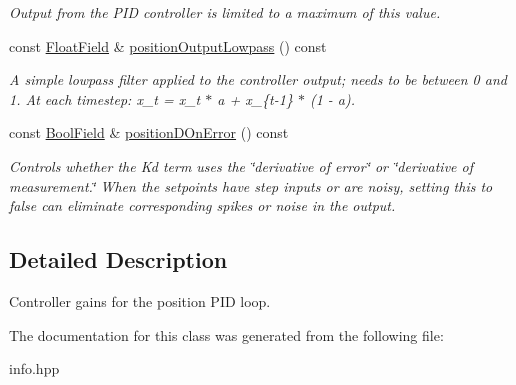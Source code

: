\begin{DoxyCompactItemize}
\begin{DoxyCompactList}\small\item\em Output from the P\+ID controller is limited to a maximum of this value. \end{DoxyCompactList}\item 
const \hyperlink{classhebi_1_1Info_1_1FloatField}{Float\+Field} \& \hyperlink{classhebi_1_1Info_1_1Settings_1_1Actuator_1_1PositionGains_ac477a60c54f5364cf1c687c014bcff89}{position\+Output\+Lowpass} () const \hypertarget{classhebi_1_1Info_1_1Settings_1_1Actuator_1_1PositionGains_ac477a60c54f5364cf1c687c014bcff89}{}\label{classhebi_1_1Info_1_1Settings_1_1Actuator_1_1PositionGains_ac477a60c54f5364cf1c687c014bcff89}

\begin{DoxyCompactList}\small\item\em A simple lowpass filter applied to the controller output; needs to be between 0 and 1. At each timestep\+: x\+\_\+t = x\+\_\+t $\ast$ a + x\+\_\+\{t-\/1\} $\ast$ (1 -\/ a). \end{DoxyCompactList}\item 
const \hyperlink{classhebi_1_1Info_1_1BoolField}{Bool\+Field} \& \hyperlink{classhebi_1_1Info_1_1Settings_1_1Actuator_1_1PositionGains_aa36f916aae582020d16b58711ec0bff6}{position\+D\+On\+Error} () const \hypertarget{classhebi_1_1Info_1_1Settings_1_1Actuator_1_1PositionGains_aa36f916aae582020d16b58711ec0bff6}{}\label{classhebi_1_1Info_1_1Settings_1_1Actuator_1_1PositionGains_aa36f916aae582020d16b58711ec0bff6}

\begin{DoxyCompactList}\small\item\em Controls whether the Kd term uses the \char`\"{}derivative of error\char`\"{} or \char`\"{}derivative of measurement.\char`\"{} When the setpoints have step inputs or are noisy, setting this to {\ttfamily false} can eliminate corresponding spikes or noise in the output. \end{DoxyCompactList}\end{DoxyCompactItemize}


\subsection{Detailed Description}
Controller gains for the position P\+ID loop. 

The documentation for this class was generated from the following file\+:\begin{DoxyCompactItemize}
\item 
info.\+hpp\end{DoxyCompactItemize}
